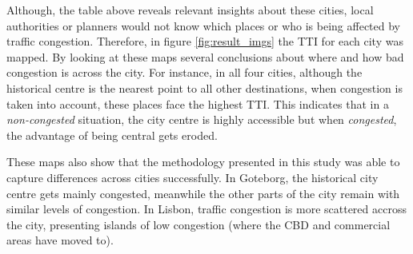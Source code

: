 \documentclass[a4paper]{jpconf}
\begin{document}
\indent Although, the table above reveals relevant insights about these cities, local authorities or planners would not know which places or who is being affected by traffic congestion. Therefore, in figure \ref{fig:result_imgs} the TTI for each city was mapped. By looking at these maps several conclusions about where and how bad congestion is across the city. For instance, in all four cities, although the historical centre is the nearest point to all other destinations, when congestion is taken into account, these places face the highest TTI. This indicates that in a \textit{non-congested} situation, the city centre is highly accessible but when \textit{congested}, the advantage of being central gets eroded. \par
\indent These maps also show that the methodology presented in this study 
was able to capture differences across cities successfully. In Goteborg, the historical city centre gets mainly congested, meanwhile the other parts of the city remain with similar levels of congestion. In Lisbon, traffic congestion is more scattered accross the city, presenting islands of low congestion (where the CBD and commercial areas have moved to).
\end{document}
